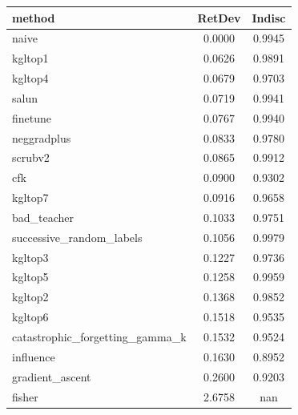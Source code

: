 \begin{tabular}{lcc}
\toprule
method & RetDev & Indisc \\
\midrule
naive & 0.0000 & 0.9945 \\
kgltop1 & 0.0626 & 0.9891 \\
kgltop4 & 0.0679 & 0.9703 \\
salun & 0.0719 & 0.9941 \\
finetune & 0.0767 & 0.9940 \\
neggradplus & 0.0833 & 0.9780 \\
scrubv2 & 0.0865 & 0.9912 \\
cfk & 0.0900 & 0.9302 \\
kgltop7 & 0.0916 & 0.9658 \\
bad_teacher & 0.1033 & 0.9751 \\
successive_random_labels & 0.1056 & 0.9979 \\
kgltop3 & 0.1227 & 0.9736 \\
kgltop5 & 0.1258 & 0.9959 \\
kgltop2 & 0.1368 & 0.9852 \\
kgltop6 & 0.1518 & 0.9535 \\
catastrophic_forgetting_gamma_k & 0.1532 & 0.9524 \\
influence & 0.1630 & 0.8952 \\
gradient_ascent & 0.2600 & 0.9203 \\
fisher & 2.6758 & nan \\
\bottomrule
\end{tabular}
